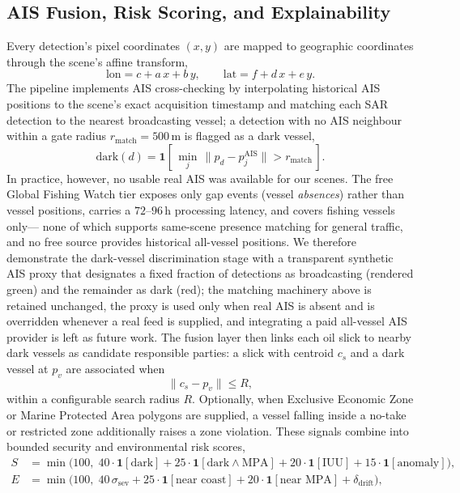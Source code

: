 \documentclass[a4paper,11pt]{article}
\begin{document}
\subsection{AIS Fusion, Risk Scoring, and Explainability}
\label{subsec:fusion}

Every detection's pixel coordinates $(x,y)$ are mapped to geographic coordinates through
the scene's affine transform,
\begin{equation}
\text{lon} = c + a\,x + b\,y, \qquad \text{lat} = f + d\,x + e\,y .
\end{equation}
The pipeline implements AIS cross-checking by interpolating historical AIS positions to
the scene's exact acquisition timestamp and matching each SAR detection to the nearest
broadcasting vessel; a detection with no AIS neighbour within a gate radius
$r_{\text{match}}=500$\,m is flagged as a dark vessel,
\begin{equation}
\text{dark}(d) = \mathbf{1}\!\left[\,\min_{j}\,\lVert p_d - p^{\text{AIS}}_j\rVert > r_{\text{match}}\,\right].
\end{equation}
In practice, however, no usable real AIS was available for our scenes. The free Global
Fishing Watch tier exposes only gap events (vessel \emph{absences}) rather than vessel
positions, carries a $72$--$96$\,h processing latency, and covers fishing vessels only---
none of which supports same-scene presence matching for general traffic, and no free
source provides historical all-vessel positions. We therefore demonstrate the
dark-vessel discrimination stage with a transparent synthetic AIS proxy that designates a
fixed fraction of detections as broadcasting (rendered green) and the remainder as dark
(red); the matching machinery above is retained unchanged, the proxy is used only when
real AIS is absent and is overridden whenever a real feed is supplied, and integrating a
paid all-vessel AIS provider is left as future work. The fusion layer then links each oil
slick to nearby dark vessels as candidate
responsible parties: a slick with centroid $c_s$ and a dark vessel at $p_v$ are
associated when
\begin{equation}
\lVert c_s - p_v \rVert \le R,
\end{equation}
within a configurable search radius $R$. Optionally, when Exclusive Economic Zone or
Marine Protected Area polygons are supplied, a vessel falling inside a no-take or
restricted zone additionally raises a zone violation. These signals combine into bounded
security and environmental risk scores,
\begin{align}
S &= \min\!\big(100,\; 40\cdot\mathbf{1}[\text{dark}] + 25\cdot\mathbf{1}[\text{dark}\wedge\text{MPA}]
   + 20\cdot\mathbf{1}[\text{IUU}] + 15\cdot\mathbf{1}[\text{anomaly}]\big), \\
E &= \min\!\big(100,\; 40\,\sigma_{\text{sev}} + 25\cdot\mathbf{1}[\text{near coast}]
   + 20\cdot\mathbf{1}[\text{near MPA}] + \delta_{\text{drift}}\big),
\end{align}
\end{document}
